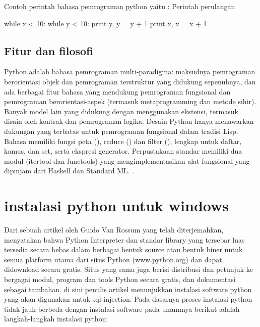       Contoh perintah bahasa pemrograman python yaitu :
      Perintah perulangan
	  
	  
      while x < 10: 
      	   while y < 10: 
		print y, 
		y = y + 1 
	   print x,
	   x = x + 1

      
\subsection {Fitur dan filosofi}
	Python adalah bahasa pemrograman multi-paradigma: maksudnya pemrograman berorientasi objek dan pemrograman terstruktur 
	yang didukung sepenuhnya, dan ada berbagai fitur bahasa yang mendukung pemrograman fungsional dan pemrograman berorientasi-aspek
	(termasuk metaprogramming dan metode sihir). Banyak model lain yang didukung dengan menggunakan ekstensi, termasuk disain 
	oleh kontrak dan pemrograman logika. 
	Desain Python hanya menawarkan dukungan yang terbatas untuk pemrograman fungsional dalam tradisi Lisp. 
	Bahasa memiliki fungsi peta (), reduce () dan filter (), lengkap untuk daftar, kamus, dan set, serta ekspresi generator. 
	Perpustakaan standar memiliki dua modul (itertool dan functools) yang mengimplementasikan alat fungsional yang dipinjam 
	dari Haskell dan Standard ML. \cite {van2007python}.

\section {instalasi python untuk windows}

	Dari sebuah artikel oleh Guido Van Rossum yang telah diterjemahkan, menyatakan bahwa Python Interpreter dan standar library 
	yang tersebar luas tersedia secara bebas dalam berbagai bentuk source atau bentuk biner untuk semua platform utama dari situs 
	Python (www.python.org) dan dapat didownload secara gratis. Situs yang sama juga berisi distribusi dan petunjuk ke bergagai 
	modul, program dan tools Python secara gratis, dan dokumentasi sebagai tambahan. \cite {van1995python}
	di sini penulis artikel menunjukkan instalasi software python yang akan
	digunakan untuk sql injection. Pada dasarnya proses instalasi python tidak jauh berbeda dengan instalasi software pada umumnya
	berikut adalah langkah-langkah instalasi python:

